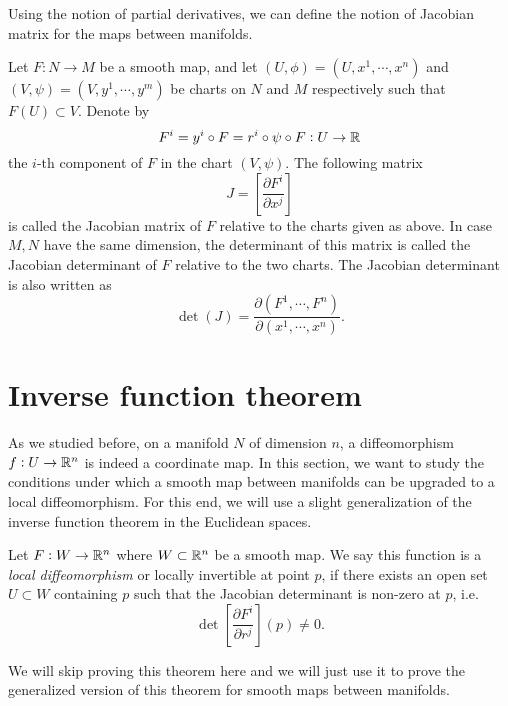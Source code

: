 Using the notion of partial derivatives, we can define the notion of Jacobian matrix for the maps between manifolds.

\begin{definition}
	Let $ F:N \to M $ be a smooth map, and let $ (U,\phi) = (U,x^1,\cdots,x^n) $ and $ (V,\psi) = (V,y^1,\cdots,y^m) $ be charts on $ N $ and $ M $ respectively such that $ F(U) \subset V $. Denote by
	\[ F^i = y^i \circ F = r^i \circ \psi \circ F : U \to \mathbb{R} \]
	the $ i\text{-th} $ component of $ F $ in the chart $ (V,\psi) $. The following matrix
	\[ J = \left[ \frac{\partial F^i}{\partial x^j} \right] \]
	is called the Jacobian matrix of $ F $ relative to the charts given as above. In case $ M,N $ have the same dimension, the determinant of this matrix is called the Jacobian determinant of $ F $ relative to the two charts. The Jacobian determinant is also written as 
	\[ \det(J) = \frac{\partial (F^1,\cdots,F^n)}{\partial(x^1,\cdots,x^n)}. \]
\end{definition}

\section{Inverse function theorem}
As we studied before, on a manifold $ N $ of dimension $ n $, a diffeomorphism $ f: U \to \mathbb{R}^n $ is indeed a coordinate map. In this section, we want to study the conditions under which a smooth map between manifolds can be upgraded to a local diffeomorphism. For this end, we will use a slight generalization of the inverse function theorem in the Euclidean spaces.

\begin{definition}
	Let $ F: W \to \mathbb{R}^n $ where $ W \subset \mathbb{R}^n $ be a smooth map. We say this function is a \emph{local diffeomorphism} or locally invertible at point $ p $, if there exists an open set $ U \subset W $ containing $ p $ such that the Jacobian determinant is non-zero at $ p $, i.e.
	\[ \det \left[  \frac{\partial F^i}{\partial r^j} \right](p) \neq 0.  \]
\end{definition}
We will skip proving this theorem here and we will just use it to prove the generalized version of this theorem for smooth maps between manifolds.

